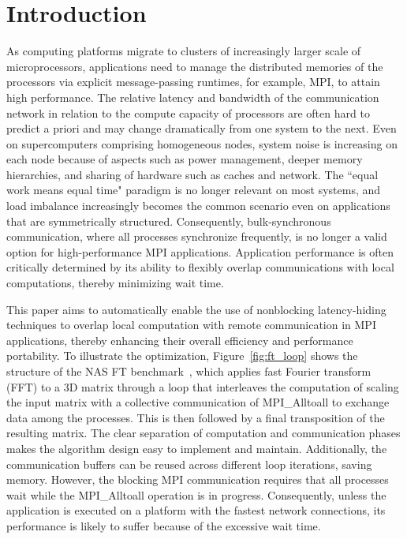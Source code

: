 \section{Introduction}
\label{sec:intro}

As computing platforms migrate to clusters of increasingly larger scale of microprocessors,
 applications need to manage the distributed memories of the processors via explicit
message-passing runtimes, for example, MPI, to attain high performance.
The relative latency and bandwidth of the communication network in relation to the compute capacity of processors
are often hard to predict a priori and may change dramatically from one system to the next.
Even on supercomputers comprising homogeneous nodes,
system noise is increasing on each node because of aspects such as power management, deeper memory hierarchies, and sharing of hardware such as caches and network. The ``equal work means equal time" paradigm is no longer relevant on most systems, and load imbalance increasingly becomes the common scenario even on applications that are symmetrically structured.
Consequently, bulk-synchronous communication, where all processes synchronize frequently, is no longer a valid option for high-performance MPI applications.
Application performance is often critically determined by its ability to flexibly overlap communications with local computations,
thereby minimizing wait time.


This paper aims to automatically enable the use of nonblocking latency-hiding techniques to overlap local computation with remote communication in MPI applications, thereby enhancing their overall efficiency and performance portability.
To illustrate the optimization, Figure~\ref{fig:ft_loop} shows the
structure of the NAS FT benchmark~\cite{npb}, which applies fast
Fourier transform (FFT) to a 3D matrix through a loop that interleaves
the computation of scaling the input matrix with a collective
communication of MPI\_Alltoall to exchange data among the
processes. This is then followed by a final transposition of the
resulting matrix.  The clear separation of computation and
communication phases makes the algorithm design easy to implement and
maintain.  Additionally, the communication buffers can be reused
across different loop iterations, saving memory.  However, the
blocking MPI communication requires that all processes wait while the
MPI\_Alltoall operation is in progress.  Consequently, unless the
application is executed on a platform with the fastest network
connections, its performance is likely to suffer because of the
excessive wait time.

